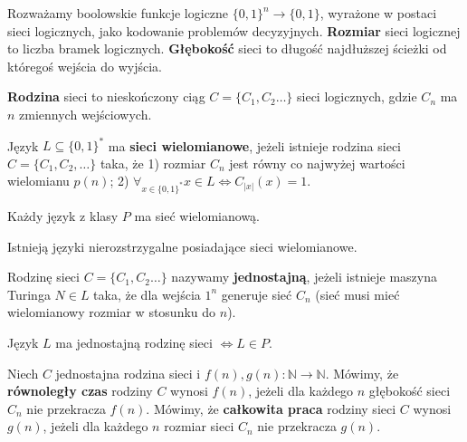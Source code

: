 \begin{definicja}
    Rozważamy boolowskie funkcje logiczne $\{0,1\}^n\rightarrow\{0,1\}$, wyrażone w postaci sieci logicznych, jako kodowanie problemów decyzyjnych.
    \textbf{Rozmiar} sieci logicznej to liczba bramek logicznych. 
    \textbf{Głębokość} sieci to długość najdłuższej ścieżki od któregoś wejścia do wyjścia.
\end{definicja}

\begin{definicja}
    \textbf{Rodzina} sieci to nieskończony ciąg $C=\{C_1,C_2\ldots\}$ sieci logicznych, gdzie $C_n$ ma $n$ zmiennych wejściowych.
\end{definicja}

\begin{definicja}
    Język $L\subseteq\{0,1\}^*$ ma \textbf{sieci wielomianowe}, jeżeli istnieje rodzina sieci $C=\{C_1,C_2,\ldots\}$ taka, że
    1) rozmiar $C_n$ jest równy co najwyżej wartości wielomianu $p(n)$;
    2) $\forall_{x\in\{0,1\}^*}{x\in L \iff C_{|x|}(x)=1}$.
\end{definicja}

\begin{lemat}
    Każdy język z klasy $P$ ma sieć wielomianową.
\end{lemat}

\begin{lemat}
    Istnieją języki nierozstrzygalne posiadające sieci wielomianowe.
\end{lemat}

\begin{definicja}
    Rodzinę sieci $C=\{C_1,C_2\ldots\}$ nazywamy \textbf{jednostajną}, jeżeli istnieje maszyna Turinga $N\in L$ taka, że 
    dla wejścia $1^n$ generuje sieć $C_n$ (sieć musi mieć wielomianowy rozmiar w stosunku do $n$).
\end{definicja}

\begin{twierdzenie}
    Język $L$ ma jednostajną rodzinę sieci $\iff L\in P$.
\end{twierdzenie}

\begin{definicja}
    Niech $C$ jednostajna rodzina sieci i $f(n), g(n):\mathbb{N}\rightarrow\mathbb{N}$.
    Mówimy, że \textbf{równoległy czas} rodziny $C$ wynosi $f(n)$, jeżeli dla każdego $n$ głębokość sieci $C_n$ nie przekracza $f(n)$.
    Mówimy, że \textbf{całkowita praca} rodziny sieci $C$ wynosi $g(n)$, jeżeli dla każdego $n$ rozmiar sieci $C_n$ nie przekracza $g(n)$.
\end{definicja}

